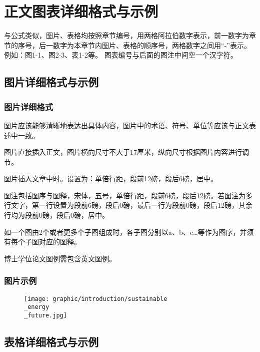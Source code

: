 \chapter{正文图表详细格式与示例}

与公式类似，图片、表格均按照章节编号，用两格阿拉伯数字表示，前一数字为章节的序号，后一数字为本章节内图片、表格的顺序号，两格数字之间用“-”表示。
例如：图1-1、图2-3、表1-2等。
图表编号与后面的图注中间空一个汉字符。

\section{图片详细格式与示例}

\subsection{图片详细格式}

图片应该能够清晰地表达出具体内容，图片中的术语、符号、单位等应该与正文表述中一致。

图片直接插入正文，图片横向尺寸不大于17厘米，纵向尺寸根据图片内容进行调节。

图片插入文章中时。设置为：单倍行距，段前12磅，段后6磅，居中。

图注包括图序与图释，宋体，五号，单倍行距，段前6磅，段后12磅。若图注为多行文字，第一行设置为段前6磅，段后0磅，最后一行为段前0磅，段后12磅，其余行均为段前0磅，段后0磅，居中。

如一个图由2个或者更多个子图组成时，各子图分别以a、b、c…等作为图序，并须有每个子图对应的图释。

博士学位论文图例需包含英文图例。

\subsection{图片示例}

\begin{figure}[!htbp]
	\centering
	\texttt{[image: graphic/introduction/sustainable\\\_energy\\\_future.jpg]}
	\label{fgr:sustainable_energy_future}
\end{figure}%

\section{表格详细格式与示例}

